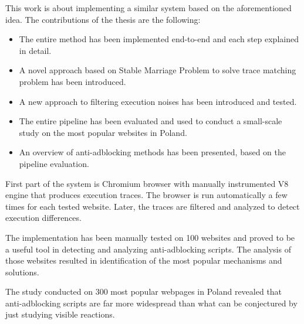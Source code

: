 This work is about implementing a similar system based on the aforementioned idea.
The contributions of the thesis are the following:
\begin{itemize}
  \item The entire method has been implemented end-to-end and each step explained in detail.
  \item A novel approach based on Stable Marriage Problem to solve trace matching problem
           has been introduced.
  \item A new approach to filtering execution noises has been introduced and tested.
  \item The entire pipeline has been evaluated and used to conduct a small-scale study on the most
           popular websites in Poland.
  \item An overview of anti-adblocking methods has been presented, based on the pipeline evaluation.
\end{itemize}

First part of the system is Chromium browser with manually instrumented V8 engine that produces
execution traces. The browser is run automatically a few times for each tested website.
Later, the traces are filtered and analyzed to detect execution differences.

The implementation has been manually tested on 100 websites and proved to be a useful tool 
in detecting and analyzing anti-adblocking scripts. 
The analysis of those websites resulted in identification of the most popular mechanisms and solutions.

The study conducted on 300 most popular webpages in Poland revealed that anti-adblocking scripts
are far more widespread than what can be conjectured by just studying visible reactions.
